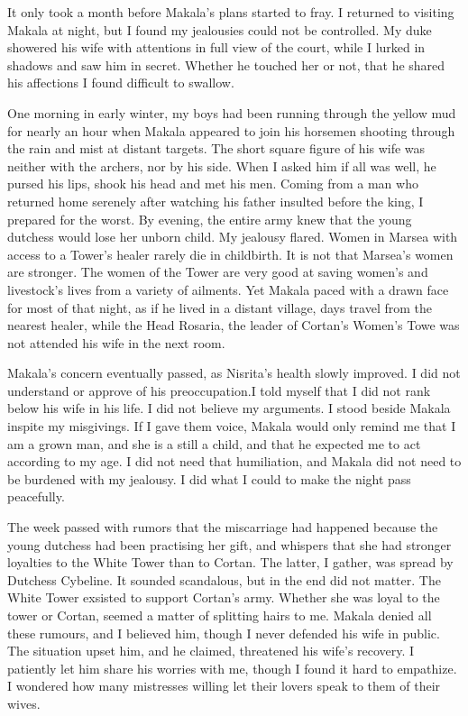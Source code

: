 \documentclass{article}
\begin{document}
It only took a month before Makala's plans started to fray. I returned to visiting Makala at night, but I found my jealousies could not be controlled. My duke showered his wife with attentions in full view of the court, while I lurked in shadows and saw him in secret. Whether he touched her or not, that he shared his affections I found difficult to swallow.

One morning in early winter, my boys had been running through the yellow mud for nearly an hour when Makala appeared to  join his horsemen shooting through the rain and mist at distant targets. The short square figure of his wife was neither with the archers, nor by his side. When I asked him if all was well, he pursed his lips, shook his head and met his men. Coming from a man who returned home serenely after watching his father insulted before the king, I prepared for the worst. By evening, the entire army knew that the young dutchess would lose her unborn child. My jealousy flared. Women in Marsea with access to a Tower's healer rarely die in childbirth. It is not that Marsea's women are stronger. The women of the Tower are very good at saving women's and livestock's lives from a variety of ailments. Yet Makala paced with a drawn face for most of that night, as if he lived in a distant village, days travel from the nearest healer, while the Head Rosaria, the leader of Cortan's Women's Towe was not attended his wife in the next room.

Makala's concern eventually passed, as Nisrita's health slowly improved. I did not understand or approve of his preoccupation.I told myself that I did not rank below his wife in his life. I did not believe my arguments. I stood beside Makala inspite my misgivings. If I gave them voice, Makala would only remind me that I am a grown man, and she is a still a child, and that he expected me to act according to my age. I did not need that humiliation, and Makala did not need to be burdened with my jealousy. I did what I could to make the night pass peacefully.

The week passed with rumors that the miscarriage had happened because the young dutchess had been practising her gift, and whispers that she had stronger loyalties to the White Tower than to Cortan. The latter, I gather, was spread by Dutchess Cybeline. It sounded scandalous, but in the end did not matter. The White Tower exsisted to support Cortan's army. Whether she was loyal to the tower or Cortan, seemed a matter of splitting hairs to me. Makala denied all these rumours, and I believed him, though I never defended his wife in public. The situation upset him, and he claimed, threatened his wife's recovery. I patiently let him share his worries with me, though I found it hard to empathize. I wondered how many mistresses willing let their lovers speak to them of their wives.
\end{document}
